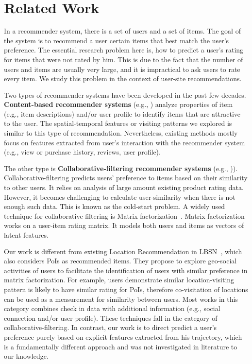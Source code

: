 
\section{Related Work}\label{sec:rw}

In a recommender system, there is a set of users and a set of items. The goal of the system is to recommend a user certain items that best match the user's preference. The essential research problem here is, how to predict a user's rating for items that were not rated by him. This is due to the fact that the number of users and items are usually very large, and it is impractical to ask users to rate every item. We study this problem in the context of user-site recommendations.

Two types of recommender systems have been developed in the past few decades. \textbf{Content-based recommender systems} (e.g., \cite{contentbasedLang95,contentbasedPazzani97}) analyze properties of item (e.g., item descriptions) and/or user profile to identify items that are attractive to the user. The spatial-temporal features or visiting patterns we explored is similar to this type of recommendation. Nevertheless, existing methods mostly focus on features extracted from user's interaction with the recommender system (e.g., view or purchase history, reviews, user profile).

The other type is \textbf{Collaborative-filtering recommender systems} (e.g., \cite{userUserRec94,amazonRecommendation,MFRec09})). Collaborative-filtering predicts users' preference to items based on their similarity to other users. It relies on analysis of large amount existing product rating data. However, it becomes challenging to calculate user-similarity when there is not enough such data. This is known as the cold-start problem. A widely used technique for collaborative-filtering is Matrix factorization~\cite{koren2009matrix}. Matrix factorization works on a user-item rating matrix. It models both users and items as vectors of latent features.

Our work is different from existing Location Recommendation in LBSN~\cite{yu2015survey, ye2010location,wang2013location, cheng2012fused}, which also considers PoIs as recommended items. They propose to explore geo-social activities of users to facilitate the identification of users with similar preference in matrix factorization. For example, users demonstrate similar location-visiting pattern is likely to have similar rating for PoIs, therefore co-visitation of locations can be used as a measurement for similarity between users. Most works in this category combines check in data with additional information (e.g., social connection and/or user profile). These techniques fall in the category of collaborative-filtering. In contrast, our work is to direct predict a user's preference purely based on explicit features extracted from his trajectory, which is a fundamentally different approach and was not investigated in literature to our knowledge.